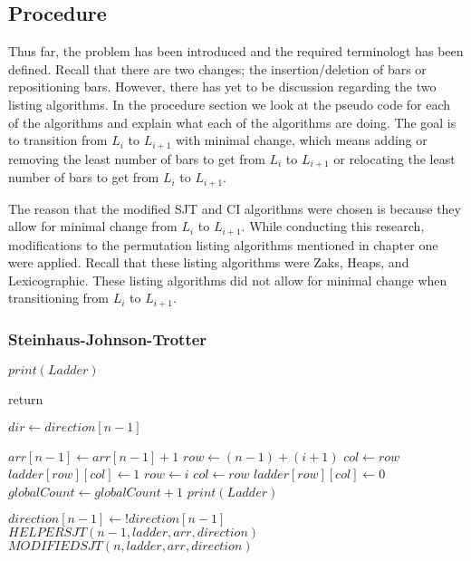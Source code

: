 \subsection{Procedure}

Thus far, the problem has been introduced and the required terminologt has been defined. Recall that there are two 
changes; the insertion/deletion of bars or repositioning bars.
However, there has yet to be discussion regarding the two 
listing algorithms. In the procedure section 
we look at the pseudo code for each of the algorithms and explain what 
each of the algorithms are doing. The goal is to transition from 
$L_{i}$ to $L_{i+1}$ with minimal change, which means adding or removing 
the least number of bars to get from $L_{i}$ to $L_{i+1}$ or relocating 
the least number of bars to get from $L_{i}$ to $L_{i+1}$.\par 

The reason that the modified SJT and CI algorithms were chosen is because they allow 
for minimal change from $L_{i}$ to $L_{i+1}$. While conducting this research, modifications 
to the permutation listing algorithms mentioned in chapter one were applied. Recall that 
these listing algorithms were Zaks, Heaps, and Lexicographic. These listing algorithms 
did not allow for minimal change when transitioning from $L_{i}$ to $L_{i+1}$.\pagebreak
\subsubsection{Steinhaus-Johnson-Trotter}


\begin{algorithm}
  \begin{algorithmic}[1]


      \State $print(Ladder)$

        \State return
      \EndIf

     
      \State $dir \gets direction[n-1]$

        
        \State $arr[n-1] \gets arr[n-1]+1$
            \State $row \gets (n-1) + (i+1)$
            \State $col \gets row$
            \State $ladder[row][col] \gets 1$
        \Else
            \State $row \gets i$
            \State $col \gets row$
            \State $ladder[row][col] \gets 0$
        \EndIf
        \State $globalCount \gets globalCount+1$
        \State $print(Ladder)$

      \EndFor
      \State $direction[n-1] \gets !direction[n-1]$
      \State $HELPERSJT(n-1, ladder, arr, direction)$
      \State $MODIFIEDSJT(n,  ladder, arr, direction)$

    \EndFunction
  \end{algorithmic}
\end{algorithm}

